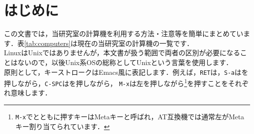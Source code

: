 \documentclass[main]{subfiles}
\begin{document}
\chapter{はじめに}

この文書では，当研究室の計算機を利用する方法・注意等を簡単にまとめています．表\ref{tab:computers}は現在の当研究室の計算機の一覧です．\\
\indent
LinuxはUnixではありませんが，本文書が扱う範囲で両者の区別が必要になることはないので，以後Unix系OSの総称としてUnixという言葉を使用します．\\
\indent
原則として，キーストロークはEmacs風に表記します．例えば，\texttt{RET}は，\texttt{S-a}はを押しながら，\texttt{C-SPC}はを押しながら，
\texttt{M-x}は左を押しながら\footnote{\texttt{M-x}でとともに押すキーはMetaキーと呼ばれ，AT互換機では通常左がMetaキー割り当てられています．}を押すことをそれぞれ意味します．\\
\end{document}
